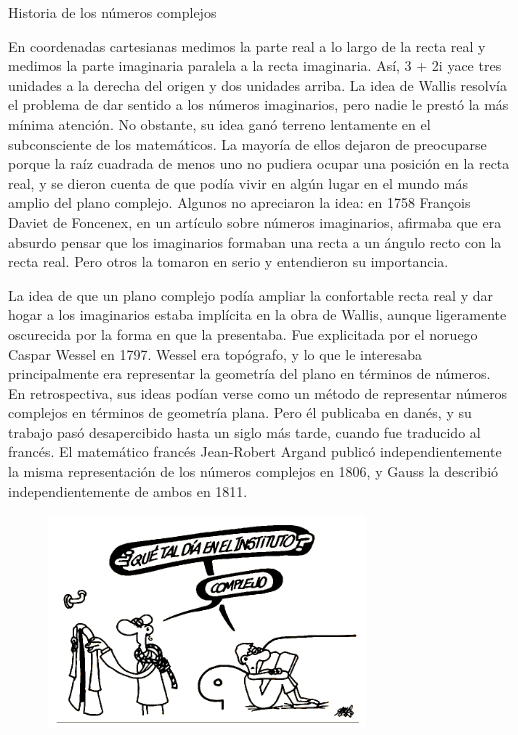 \begin{myexampleblock}{Historia de los números complejos}
\begin{small}
\vspace{1mm} En coordenadas cartesianas medimos la parte real a lo largo de la recta real y medimos la parte imaginaria paralela a la recta imaginaria. Así, 3 + 2i yace tres unidades a la derecha del origen y dos unidades arriba. La idea de Wallis resolvía el problema de dar sentido a los números imaginarios, pero nadie le prestó la más mínima atención. No obstante, su idea ganó terreno lentamente en el subconsciente de los matemáticos. La mayoría de ellos dejaron de preocuparse porque la raíz cuadrada de menos uno no pudiera ocupar una posición en la recta real, y se dieron cuenta de que podía vivir en algún lugar en el mundo más amplio del plano complejo. Algunos no apreciaron la idea: en 1758 François Daviet de Foncenex, en un artículo sobre números imaginarios, afirmaba que era absurdo pensar que los imaginarios formaban una recta a un ángulo recto con la recta real. Pero otros la tomaron en serio y entendieron su importancia.

\vspace{1mm} La idea de que un plano complejo podía ampliar la confortable recta real y dar hogar a los imaginarios estaba implícita en la obra de Wallis, aunque ligeramente oscurecida por la forma en que la presentaba. Fue explicitada por el noruego Caspar Wessel en 1797. Wessel era topógrafo, y lo que le interesaba principalmente era representar la geometría del plano en términos de números. En retrospectiva, sus ideas podían verse como un método de representar números complejos en términos de geometría plana. Pero él publicaba en danés, y su trabajo pasó desapercibido hasta un siglo más tarde, cuando fue traducido al francés. El matemático francés Jean-Robert Argand publicó independientemente la misma representación de los números complejos en 1806, y Gauss la describió independientemente de ambos en 1811.
\end{small}	
\end{myexampleblock}


\begin{figure}[H]
	\centering
	\includegraphics[width=0.75\textwidth]{img-c/comp01.png}
\end{figure}



